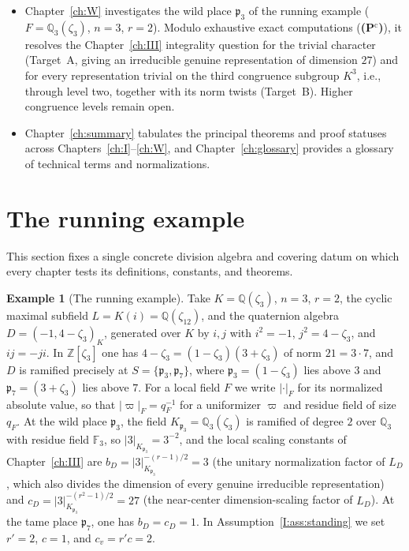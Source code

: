 \documentclass[12pt,letterpaper,oneside]{book}
\theoremstyle{plain}
\theoremstyle{definition}
\newtheorem{example}[theorem]{Example}
\newcommand{\Pctag}{\textnormal{\textbf{(P$^{\mathrm c}$)}}}
\begin{document}
\begin{itemize}[leftmargin=*]
\item Chapter~\ref{ch:W} investigates the wild place $\mathfrak p_3$ of the running example ($F=\mathbb Q_3(\zeta_3)$, $n=3$, $r=2$). Modulo exhaustive exact computations (\Pctag), it resolves the Chapter~\ref{ch:III} integrality question for the trivial character (Target~A, giving an irreducible genuine representation of dimension $27$) and for every representation trivial on the third congruence subgroup $K^3$, i.e., through level two, together with its norm twists (Target~B). Higher congruence levels remain open.
\item Chapter~\ref{ch:summary} tabulates the principal theorems and proof statuses across Chapters~\ref{ch:I}--\ref{ch:W}, and Chapter~\ref{ch:glossary} provides a glossary of technical terms and normalizations.
\end{itemize}

\section{The running example}\label{sec:running}
This section fixes a single concrete division algebra and covering datum on which every chapter tests its definitions, constants, and theorems.

\begin{example}[The running example]\label{ex:running}
Take $K=\mathbb Q(\zeta_3)$, $n=3$, $r=2$, the cyclic maximal subfield $L=K(i)=\mathbb Q(\zeta_{12})$, and the quaternion algebra $D=(-1,4-\zeta_3)_K$, generated over $K$ by $i,j$ with $i^2=-1$, $j^2=4-\zeta_3$, and $ij=-ji$. In $\mathbb Z[\zeta_3]$ one has $4-\zeta_3=(1-\zeta_3)(3+\zeta_3)$ of norm $21=3\cdot 7$, and $D$ is ramified precisely at $S=\{\mathfrak p_3,\mathfrak p_7\}$, where $\mathfrak p_3=(1-\zeta_3)$ lies above $3$ and $\mathfrak p_7=(3+\zeta_3)$ lies above $7$. For a local field $F$ we write $|\cdot|_F$ for its normalized absolute value, so that $|\varpi|_F=q_F^{-1}$ for a uniformizer $\varpi$ and residue field of size $q_F$. At the wild place $\mathfrak p_3$, the field $K_{\mathfrak p_3}=\mathbb Q_3(\zeta_3)$ is ramified of degree $2$ over $\mathbb Q_3$ with residue field $\mathbb F_3$, so $|3|_{K_{\mathfrak p_3}}=3^{-2}$, and the local scaling constants of Chapter~\ref{ch:III} are $b_D = |3|_{K_{\mathfrak p_3}}^{-(r-1)/2} = 3$ (the unitary normalization factor of $L_D$, which also divides the dimension of every genuine irreducible representation) and $c_D = |3|_{K_{\mathfrak p_3}}^{-(r^2-1)/2} = 27$ (the near-center dimension-scaling factor of $L_D$). At the tame place $\mathfrak p_7$, one has $b_D=c_D=1$. In Assumption~\ref{I:ass:standing} we set $r'=2$, $c=1$, and $c_v=r'c=2$.
\end{example}
\end{document}
